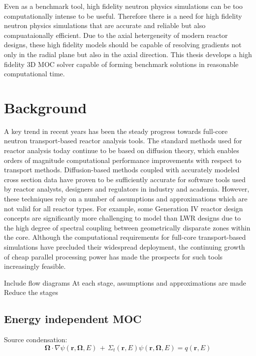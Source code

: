 Even as a benchmark tool, high fidelity neutron physics simulations can be too computationally intense to be useful. Therefore there is a need for high fidelity neutron physics simulations that are accurate and reliable but also compuataionally efficient. Due to the axial hetergeneity of modern reactor designs, these high fidelity models should be capable of resolving gradients not only in the radial plane but also in the axial direction. This thesis develops a high fidelity 3D \ac{MOC} solver capable of forming benchmark solutions in reasonable computational time.

\section{Background}
\label{sec:chap1-background}

A key trend in recent years has been the steady progress towards full-core neutron transport-based reactor analysis tools. The standard methods used for reactor analysis today continue to be based on diffusion theory, which enables orders of magnitude computational performance improvements with respect to transport methods. Diffusion-based methods coupled with accurately modeled cross section data have proven to be sufficiently accurate for software tools used by reactor analysts, designers and regulators in industry and academia. However, these techniques rely on a number of assumptions and approximations which are not valid for all reactor types. For example, some Generation IV reactor design concepts are significantly more challenging to model than \ac{LWR} designs due to the high degree of spectral coupling between geometrically disparate zones within the core. Although the computational requirements for full-core transport-based simulations have precluded their widespread deployment, the continuing growth of cheap parallel processing power has made the prospects for such tools increasingly feasible.

Include flow diagrams
At each stage, assumptions and approximations are made
Reduce the stages

\subsection{Energy independent MOC}

Source condensation:
\begin{dmath}
\mathbf{\Omega} \cdot \nabla \psi(\mathbf{r},\mathbf{\Omega},E) \, + \, \Sigma_{t}(\mathbf{r},E)\psi(\mathbf{r},\mathbf{\Omega},E) = q(\mathbf{r}, E)
\end{dmath}

